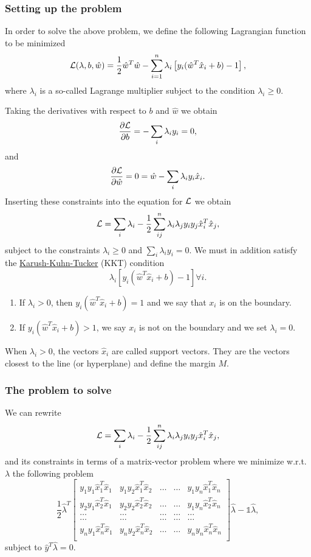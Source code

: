 \documentclass{beamer}
\begin{document}
\begin{frame}
\frametitle{Setting up the problem}

In order to solve the above problem, we define the following Lagrangian function to be minimized 
\[
{\cal L}(\lambda,b,\hat{w})=\frac{1}{2}\hat{w}^T\hat{w}-\sum_{i=1}^n\lambda_i\left[y_i(\hat{w}^T\hat{x}_i+b)-1\right],
\]
where $\lambda_i$ is a so-called Lagrange multiplier subject to the condition $\lambda_i \geq 0$.

Taking the derivatives  with respect to $b$ and $\hat{w}$ we obtain 
\[
\frac{\partial {\cal L}}{\partial b} = -\sum_{i} \lambda_iy_i=0,
\]
and 
\[
\frac{\partial {\cal L}}{\partial \hat{w}} = 0 = \hat{w}-\sum_{i} \lambda_iy_i\hat{x}_i.
\]
Inserting these constraints into the equation for ${\cal L}$ we obtain
\[
{\cal L}=\sum_i\lambda_i-\frac{1}{2}\sum_{ij}^n\lambda_i\lambda_jy_iy_j\hat{x}_i^T\hat{x}_j,
\]
subject to the constraints $\lambda_i\geq 0$ and $\sum_i\lambda_iy_i=0$. 
We must in addition satisfy the \href{{https://en.wikipedia.org/wiki/Karush%
\[
\lambda_i\left[y_i(\hat{w}^T\hat{x}_i+b) -1\right] \forall i.
\]
\begin{enumerate}
\item If $\lambda_i > 0$, then $y_i(\hat{w}^T\hat{x}_i+b)=1$ and we say that $x_i$ is on the boundary.

\item If $y_i(\hat{w}^T\hat{x}_i+b)> 1$, we say $x_i$ is not on the boundary and we set $\lambda_i=0$. 
\end{enumerate}

\noindent
When $\lambda_i > 0$, the vectors $\hat{x}_i$ are called support vectors. They are the vectors closest to the line (or hyperplane) and define the margin $M$.
\end{frame}

\begin{frame}
\frametitle{The problem to solve}

We can rewrite 
\[
{\cal L}=\sum_i\lambda_i-\frac{1}{2}\sum_{ij}^n\lambda_i\lambda_jy_iy_j\hat{x}_i^T\hat{x}_j,
\]
and its constraints in terms of a matrix-vector problem where we minimize w.r.t. $\lambda$ the following problem
\[
\frac{1}{2} \hat{\lambda}^T\begin{bmatrix} y_1y_1\hat{x}_1^T\hat{x}_1 & y_1y_2\hat{x}_1^T\hat{x}_2 & \dots & \dots & y_1y_n\hat{x}_1^T\hat{x}_n \\
y_2y_1\hat{x}_2^T\hat{x}_1 & y_2y_2\hat{x}_2^T\hat{x}_2 & \dots & \dots & y_1y_n\hat{x}_2^T\hat{x}_n \\
\dots & \dots & \dots & \dots & \dots \\
\dots & \dots & \dots & \dots & \dots \\
y_ny_1\hat{x}_n^T\hat{x}_1 & y_ny_2\hat{x}_n^T\hat{x}_2 & \dots & \dots & y_ny_n\hat{x}_n^T\hat{x}_n \\
\end{bmatrix}\hat{\lambda}-\mathbb{1}\hat{\lambda}, 
\]
subject to $\hat{y}^T\hat{\lambda}=0$.
\end{frame}
\end{document}
